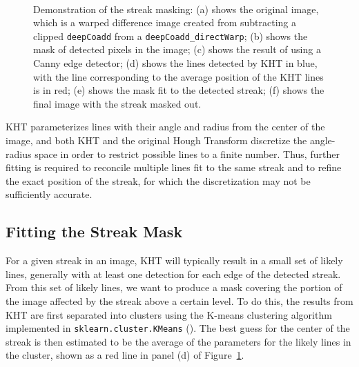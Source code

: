 \documentclass[DM,authoryear,toc]{lsstdoc}
\begin{document}
\begin{figure}
\qquad
{}  \\
\caption{Demonstration of the streak masking: (a) shows the original image, which is a warped difference image created from subtracting a clipped \texttt{deepCoadd} from a \texttt{deepCoadd\_directWarp}; (b) shows the mask of detected pixels in the image; (c) shows the result of using a Canny edge detector; (d) shows the lines detected by KHT in blue, with the line corresponding to the average position of the KHT lines is in red; (e) shows the mask fit to the detected streak; (f) shows the final image with the streak masked out.}
\label{fig: algo steps}
\end{figure}

KHT parameterizes lines with their angle and radius from the center of the image, and both KHT and the original Hough Transform discretize the angle-radius space in order to restrict possible lines to a finite number. Thus, further fitting is required to reconcile multiple lines fit to the same streak and to refine the exact position of the streak, for which the discretization may not be sufficiently accurate.


\subsection{Fitting the Streak Mask}
\label{sec: line fitting}

For a given streak in an image, KHT will typically result in a small set of likely lines, generally with at least one detection for each edge of the detected streak. From this set of likely lines, we want to produce a mask covering the portion of the image affected by the streak above a certain level. To do this, the results from KHT are first separated into clusters using the K-means clustering algorithm implemented in \texttt{sklearn.cluster.KMeans} (\citealt{Pedregosa:2011}). The best guess for the center of the streak is then estimated to be the average of the parameters for the likely lines in the cluster, shown as a red line in panel (d) of Figure~\ref{fig: algo steps}.
\end{document}
